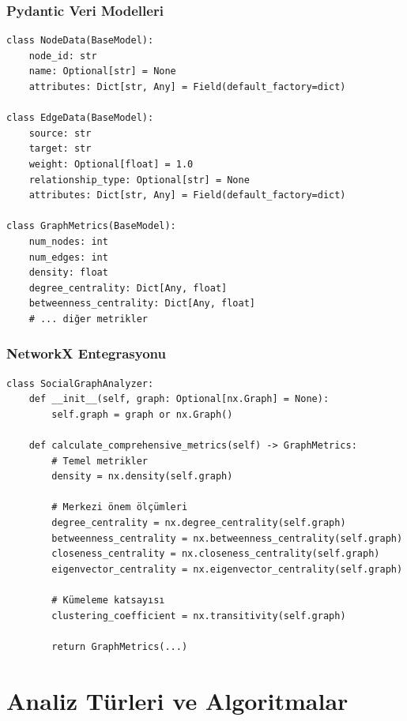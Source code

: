 \documentclass[aspectratio=169]{beamer}
\begin{document}
\begin{frame}[fragile]
\frametitle{Pydantic Veri Modelleri}
\begin{lstlisting}[caption=Temel Veri Yapıları]
class NodeData(BaseModel):
    node_id: str
    name: Optional[str] = None
    attributes: Dict[str, Any] = Field(default_factory=dict)

class EdgeData(BaseModel):
    source: str
    target: str
    weight: Optional[float] = 1.0
    relationship_type: Optional[str] = None
    attributes: Dict[str, Any] = Field(default_factory=dict)

class GraphMetrics(BaseModel):
    num_nodes: int
    num_edges: int
    density: float
    degree_centrality: Dict[Any, float]
    betweenness_centrality: Dict[Any, float]
    # ... diğer metrikler
\end{lstlisting}
\end{frame}

\begin{frame}[fragile]
\frametitle{NetworkX Entegrasyonu}
\begin{lstlisting}[caption=Sosyal Ağ Analiz Araçları]
class SocialGraphAnalyzer:
    def __init__(self, graph: Optional[nx.Graph] = None):
        self.graph = graph or nx.Graph()
    
    def calculate_comprehensive_metrics(self) -> GraphMetrics:
        # Temel metrikler
        density = nx.density(self.graph)
        
        # Merkezi önem ölçümleri
        degree_centrality = nx.degree_centrality(self.graph)
        betweenness_centrality = nx.betweenness_centrality(self.graph)
        closeness_centrality = nx.closeness_centrality(self.graph)
        eigenvector_centrality = nx.eigenvector_centrality(self.graph)
        
        # Kümeleme katsayısı
        clustering_coefficient = nx.transitivity(self.graph)
        
        return GraphMetrics(...)
\end{lstlisting}
\end{frame}

\section{Analiz Türleri ve Algoritmalar}
\end{document}
